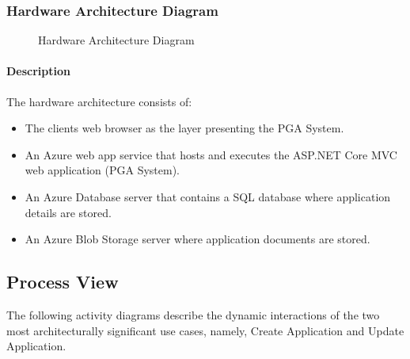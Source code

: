 \documentclass[11pt]{article}
\begin{document}
\subsubsection{Hardware Architecture Diagram}
\begin{figure}[H]
	\caption{Hardware Architecture Diagram}
\end{figure}
\paragraph{Description}
The hardware architecture consists of:

\begin{itemize}
\item The clients web browser as the layer presenting the PGA System.
\item An Azure web app service that hosts and executes the ASP.NET Core MVC web application (PGA System).
\item An Azure Database server that contains a SQL database where application details are stored. 
\item An Azure Blob Storage server where application documents are stored.

\end{itemize}
\subsection{Process View}
The following activity diagrams describe the dynamic interactions of the two most architecturally significant use cases, namely, Create Application and Update Application.
\end{document}
